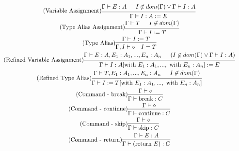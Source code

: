 \documentclass{article}
\newcommand{\ruleSpace}{\ \ \ }
\begin{document}
\begin{gather}
\tag{Variable Assignment}
\begin{prooftree}
\hypo{\Gamma \vdash E:A}
\hypo{I \not\in dom(\Gamma) \lor \Gamma \vdash I:A}
\infer2{\Gamma \vdash I:A := E }
\end{prooftree}
\\
\tag{Type Alias Assignment}
\begin{prooftree}
\hypo{\Gamma \vdash T}
\hypo{I \not\in dom(\Gamma)}
\infer2{\Gamma \vdash I := T }
\end{prooftree}
\\
\tag{Type Alias}
\begin{prooftree}
\hypo{\Gamma \vdash I := T}
\infer1{\Gamma, I \vdash \diamond \ruleSpace I = T}
\end{prooftree}
\\
\tag{Refined Variable Assignment}
\begin{prooftree}
\hypo{\Gamma \vdash E: A, E_1: A_1, ..., E_n:A_n}
\hypo{(I \not\in dom(\Gamma) \lor \Gamma \vdash I:A)}
\infer2{\Gamma \vdash I: A[\text{with } E_1: A_1, ..., \text{ with } E_n: A_n] := E}
\end{prooftree}
\\
\tag{Refined Type Alias}
\begin{prooftree}
\hypo{\Gamma \vdash T, E_1: A_1, ..., E_n: A_n}
\hypo{I \not\in dom(\Gamma)}
\infer2{\Gamma \vdash I := T[\text{with } E_1: A_1, ...,\text{ with } E_n: A_n]}
\end{prooftree}
\\
\tag{Command - break}
\begin{prooftree}
\hypo{\Gamma \vdash \diamond}
\infer1{\Gamma \vdash \text{break}: C}
\end{prooftree}
\\
\tag{Command - continue}
\begin{prooftree}
\hypo{\Gamma \vdash \diamond}
\infer1{\Gamma \vdash \text{continue}: C}
\end{prooftree}
\\
\tag{Command - skip}
\begin{prooftree}
\hypo{\Gamma \vdash \diamond}
\infer1{\Gamma \vdash \text{skip}: C}
\end{prooftree}
\\
\tag{Command - return}
\begin{prooftree}
\hypo{\Gamma \vdash E:A}
\infer1{\Gamma \vdash (\text{return } E): C}
\end{prooftree}
\end{gather}
\end{document}

